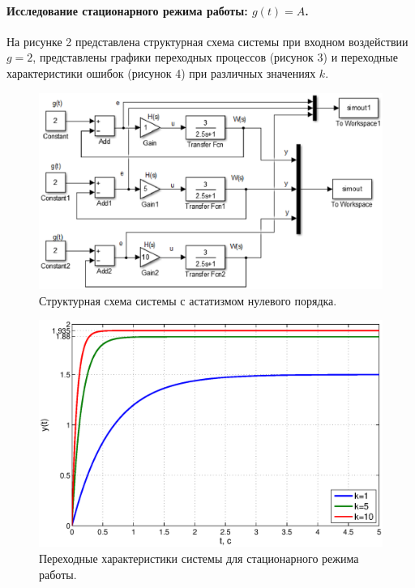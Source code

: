 \documentclass[12pt,a4paper]{article}
\begin{document}
\paragraph*{Исследование стационарного режима работы: $g(t)=A$.} 
На рисунке 2 представлена структурная схема системы при входном воздействии $g=2$, представлены графики переходных процессов (рисунок 3) и переходные характеристики ошибок (рисунок 4) при различных значениях $k$. 
\begin{figure}[h!]
	\centering
	\includegraphics[width=0.8\linewidth]{cxema1.eps}
	\caption{Структурная схема системы с астатизмом нулевого порядка.}
\end{figure}
\begin{figure}[H]
	\centering
	\includegraphics[width=1\linewidth]{1.1.1.eps}
	\caption{Переходные характеристики системы для стационарного режима работы.}
\end{figure}
\end{document}
